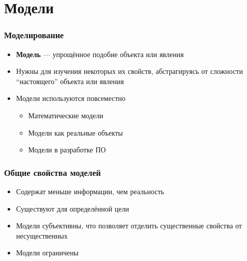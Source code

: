 \documentclass{../../slides-style}
\begin{document}
    \begin{frame}[plain]
        \titlepage
    \end{frame}

    \section{Модели}

    \begin{frame}
        \frametitle{Моделирование}
        \begin{itemize}
            \item \textbf{Модель} --- упрощённое подобие объекта или явления
            \item Нужны для изучения некоторых их свойств, абстрагируясь от сложности ``настоящего'' объекта или явления
            \item Модели используются повсеместно
            \begin{itemize}
                \item Математические модели
                \item Модели как реальные объекты
                \item Модели в разработке ПО
            \end{itemize}
        \end{itemize}
    \end{frame}

    \begin{frame}
        \frametitle{Общие свойства моделей}
        \begin{itemize}
            \item Содержат меньше информации, чем реальность
            \item Существуют для определённой цели
            \item Модели субъективны, что позволяет отделить существенные свойства от несущественных
            \item Модели ограничены
        \end{itemize}

    \end{frame}
\end{document}
